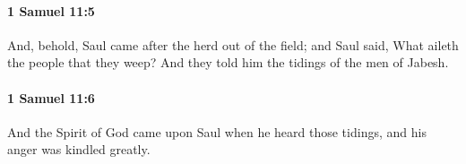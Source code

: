 		\paragraph{1 Samuel 11:5} %
			\label{1SAMUEL-11-5}

			And, behold, Saul came after the herd out of the field; and Saul said, What aileth the people that they weep? And they told him the tidings of the men of Jabesh.


		\paragraph{1 Samuel 11:6} %
			\label{1SAMUEL-11-6}

			And the Spirit of God came upon Saul when he heard those tidings, and his anger was kindled greatly.


